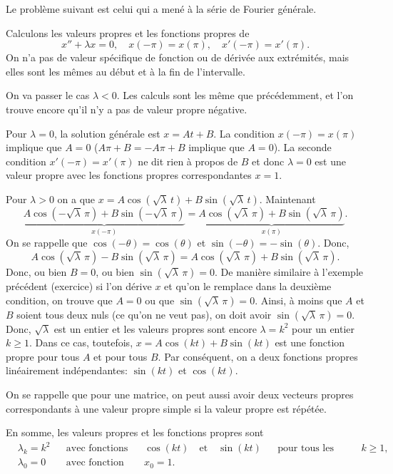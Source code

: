 Le problème suivant est celui qui a mené à la série de Fourier générale.

\begin{example} \label{bvp-periodic:example}
Calculons les valeurs propres et les fonctions propres de 
\begin{equation*}
x'' + \lambda x = 0, \quad x(-\pi) = x(\pi), \quad x'(-\pi) = x'(\pi) .
\end{equation*}
On n'a pas de valeur spécifique de fonction ou de dérivée aux extrémités, mais elles sont les mêmes au début et à la fin de l'intervalle. 

On va passer le cas $\lambda < 0$.  Les calculs sont les même que précédemment, et l'on trouve encore qu'il n'y a pas de valeur propre négative. 

Pour $\lambda = 0$, la solution générale est $x = At + B$.  La condition
$x(-\pi) = x(\pi)$ implique que $A=0$ ($A\pi + B = -A\pi +B$ implique que $A=0$).
La seconde condition $x'(-\pi) = x'(\pi)$ ne dit rien à propos de  $B$ et donc
$\lambda=0$ est une valeur propre avec les fonctions propres correspondantes $x=1$.

Pour  $\lambda > 0$ on a que 
$x = A \cos ( \sqrt{\lambda}\, t ) + B \sin ( \sqrt{\lambda}\, t)$.
Maintenant
\begin{equation*}
\underbrace{A \cos (-\sqrt{\lambda}\, \pi) + B \sin (-\sqrt{\lambda}\,
\pi)}_{x(-\pi)}
=
\underbrace{A \cos (  \sqrt{\lambda}\, \pi ) + B \sin ( \sqrt{\lambda}\,
\pi)}_{x(\pi)} .
\end{equation*}
On se rappelle que $\cos (- \theta) = \cos (\theta)$ et
$\sin (-\theta) = - \sin (\theta)$. Donc,
\begin{equation*}
A \cos (\sqrt{\lambda}\, \pi) - B \sin ( \sqrt{\lambda}\, \pi)
=
A \cos (\sqrt{\lambda}\, \pi) + B \sin ( \sqrt{\lambda}\, \pi).
\end{equation*}
Donc, ou bien $B=0$, ou bien $\sin ( \sqrt{\lambda}\, \pi) = 0$.
De manière similaire à l'exemple précédent (exercice) si l'on dérive $x$ et qu'on le remplace dans la deuxième condition, on trouve que $A=0$ ou que $\sin ( \sqrt{\lambda}\, \pi) = 0$.
Ainsi, à moins que $A$ et $B$ soient tous deux nuls (ce qu'on ne veut pas), on doit avoir $\sin ( \sqrt{\lambda}\, \pi ) = 0$.  Donc, $\sqrt{\lambda}$
est un entier et les valeurs propres sont encore $\lambda = k^2$ pour un entier
 $k \geq 1$. Dans ce cas, toutefois,  
$x = A \cos (k t) + B \sin (k t)$ est une fonction propre pour tous  $A$ et pour tous $B$.
Par conséquent, on a deux fonctions propres linéairement indépendantes: $\sin (kt)$ et $\cos (kt)$.

On se rappelle que pour une matrice, on peut aussi avoir deux vecteurs propres correspondants à une valeur propre simple si la valeur propre est répétée. 

En somme, les valeurs propres et les fonctions propres sont 
\begin{align*}
& \lambda_k = k^2 & & \text{avec fonctions propres} & &
\cos (k t) \quad \text{et}\quad  \sin (k t)
 & & \text{pour tous les entiers } k \geq 1 , \\
& \lambda_0 = 0 & & \text{avec fonction propre} & & x_0 = 1.
\end{align*}
\end{example}

